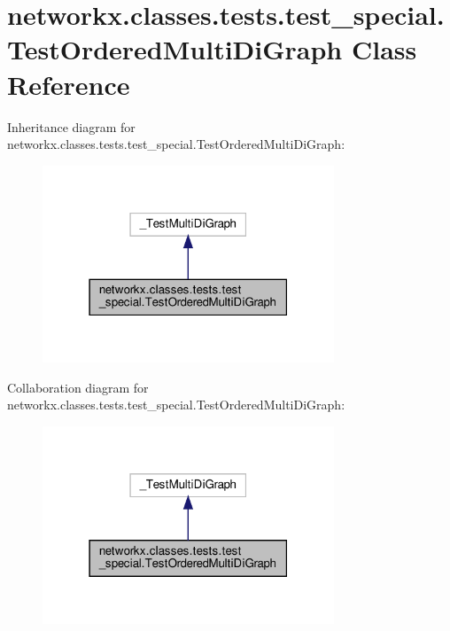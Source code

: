 \hypertarget{classnetworkx_1_1classes_1_1tests_1_1test__special_1_1TestOrderedMultiDiGraph}{}\section{networkx.\+classes.\+tests.\+test\+\_\+special.\+Test\+Ordered\+Multi\+Di\+Graph Class Reference}
\label{classnetworkx_1_1classes_1_1tests_1_1test__special_1_1TestOrderedMultiDiGraph}


Inheritance diagram for networkx.\+classes.\+tests.\+test\+\_\+special.\+Test\+Ordered\+Multi\+Di\+Graph\+:
\nopagebreak
\begin{figure}[H]
\begin{center}
\leavevmode
\includegraphics[width=247pt]{classnetworkx_1_1classes_1_1tests_1_1test__special_1_1TestOrderedMultiDiGraph__inherit__graph}
\end{center}
\end{figure}


Collaboration diagram for networkx.\+classes.\+tests.\+test\+\_\+special.\+Test\+Ordered\+Multi\+Di\+Graph\+:
\nopagebreak
\begin{figure}[H]
\begin{center}
\leavevmode
\includegraphics[width=247pt]{classnetworkx_1_1classes_1_1tests_1_1test__special_1_1TestOrderedMultiDiGraph__coll__graph}
\end{center}
\end{figure}
